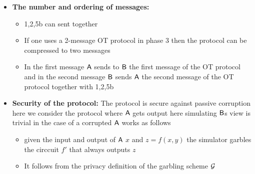 \begin{itemize}
    \item \textbf{The number and ordering of messages:} 
    \begin{itemize}
        \item 1,2,5b can sent together
        \item If one uses a 2-message OT protocol in phase 3 then the protocol can be compressed to two messages
        \item In the first message $\mathsf{A}$ sends to $\mathsf{B}$ the first message of the OT protocol and in the second message $\mathsf{B}$ sends $\mathsf{A}$ the second message of the OT protocol together with 1,2,5b
    \end{itemize}
    \item \textbf{Security of the protocol:} The protocol is secure against passive corruption here we consider the protocol where $\mathsf{A}$ gets output here simulating $\mathsf{B}$s view is trivial in the case of a corrupted $\mathsf{A}$ works as follows
        \begin{itemize}
            \item given the input and output of $\mathsf{A}$ $x$ and $z = f(x,y)$ the simulator garbles the circcuit $f'$ that always outputs $z$
            \item It follows from the privacy definition of the garbling scheme $\mathcal G$
        \end{itemize}
\end{itemize}

